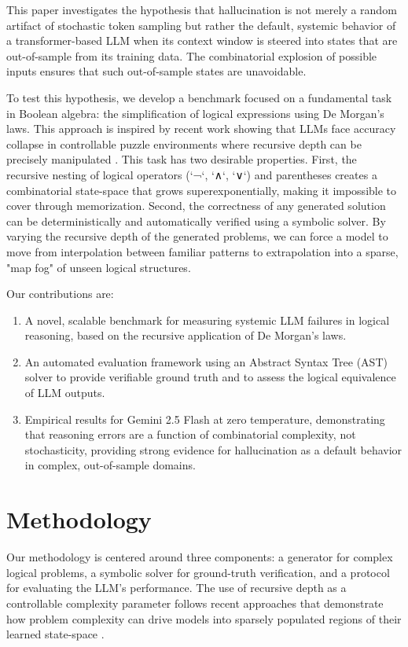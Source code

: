 \documentclass[11pt,a4paper]{article}
\begin{document}
This paper investigates the hypothesis that hallucination is not merely a random artifact of stochastic token sampling but rather the default, systemic behavior of a transformer-based LLM when its context window is steered into states that are out-of-sample from its training data. The combinatorial explosion of possible inputs ensures that such out-of-sample states are unavoidable.

To test this hypothesis, we develop a benchmark focused on a fundamental task in Boolean algebra: the simplification of logical expressions using De Morgan's laws. This approach is inspired by recent work showing that LLMs face accuracy collapse in controllable puzzle environments where recursive depth can be precisely manipulated \citep{shojaee2025illusion}. This task has two desirable properties. First, the recursive nesting of logical operators (`¬`, `∧`, `∨`) and parentheses creates a combinatorial state-space that grows superexponentially, making it impossible to cover through memorization. Second, the correctness of any generated solution can be deterministically and automatically verified using a symbolic solver. By varying the recursive depth of the generated problems, we can force a model to move from interpolation between familiar patterns to extrapolation into a sparse, "map fog" of unseen logical structures.

Our contributions are:
\begin{enumerate}
    \item A novel, scalable benchmark for measuring systemic LLM failures in logical reasoning, based on the recursive application of De Morgan's laws.
    \item An automated evaluation framework using an Abstract Syntax Tree (AST) solver to provide verifiable ground truth and to assess the logical equivalence of LLM outputs.
    \item Empirical results for Gemini 2.5 Flash at zero temperature, demonstrating that reasoning errors are a function of combinatorial complexity, not stochasticity, providing strong evidence for hallucination as a default behavior in complex, out-of-sample domains.
\end{enumerate}

\section{Methodology}
Our methodology is centered around three components: a generator for complex logical problems, a symbolic solver for ground-truth verification, and a protocol for evaluating the LLM's performance. The use of recursive depth as a controllable complexity parameter follows recent approaches that demonstrate how problem complexity can drive models into sparsely populated regions of their learned state-space \citep{shojaee2025illusion}.
\end{document}
